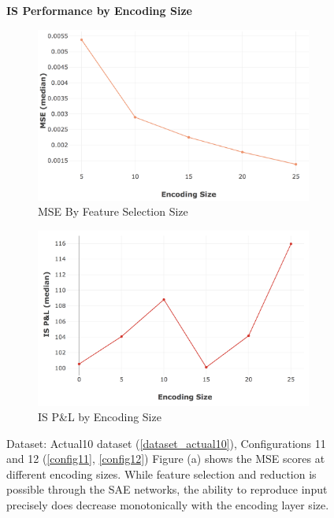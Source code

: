 \documentclass[a4paper,11pt,oneside]{article}
\theoremstyle{plain}
\theoremstyle{definition}
\begin{document}
	\begin{figure}[H]
		\centering
		\textbf{IS Performance by Encoding Size}
		\begin{subfigure}{0.99\linewidth}
			\centering 
			\includegraphics[scale=0.4]{images/results/8_2_determinants/actual_sae_mse.png}
			\caption[MSE By Feature Selection Size]{MSE By Feature Selection Size}
			\label{figure-actual_sae_mse}
		\end{subfigure}
		\begin{subfigure}{0.99\linewidth}
		\centering 
		\includegraphics[scale=0.4]{images/results/8_2_determinants/IS_Encoding_PL_median.png} 
		\caption[IS SAE Performance: MSE and P\&L by Encoding Size]{IS P\&L by Encoding Size}
		\label{figure-IS Encoding_PL_median}
		\end{subfigure}
	\caption[IS Performance by Encoding Size]
	{Dataset: Actual10 dataset (\ref{dataset_actual10}), Configurations 11 and 12 (\ref{config11}, \ref{config12})
		\newline Figure (a) shows the MSE scores at different encoding sizes. While feature selection and reduction is possible through the SAE networks, the ability to reproduce input precisely does decrease monotonically with the encoding layer size. 
}
\end{figure}
\end{document}
